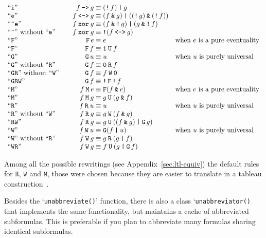 \documentclass[a4paper,twoside,10pt,DIV=12]{scrreprt}
\DeclareMathOperator{\F}{\texttt{F}}
\DeclareMathOperator{\G}{\texttt{G}}
\newcommand{\U}{\mathbin{\texttt{U}}}
\newcommand{\R}{\mathbin{\texttt{R}}}
\newcommand{\M}{\mathbin{\texttt{M}}}
\newcommand{\W}{\mathbin{\texttt{W}}}
\DeclareMathOperator{\NOT}{\texttt{!}}
\newcommand{\XOR}{\mathbin{\texttt{xor}}}
\newcommand{\IMPLIES}{\mathbin{\texttt{->}}}
\newcommand{\EQUIV}{\mathbin{\texttt{<->}}}
\newcommand{\OR}{\mathbin{\texttt{|}}}
\newcommand{\AND}{\mathbin{\texttt{\&}}}
\newcommand{\0}{\texttt{0}}
\newcommand{\1}{\texttt{1}}
\begin{document}
\[
\begin{array}{l@{\qquad}r@{\;}c@{\;}ll}
``\texttt{i}" & f\IMPLIES g &\equiv&  (\NOT f)\OR g\\
``\texttt{e}" & f\EQUIV g &\equiv&  (f\AND g)\OR ((\NOT g)\AND(\NOT f))\\
``\texttt{\^{}e}" & f\XOR g &\equiv&  (f\AND\NOT g)\OR (g\AND\NOT f)\\
``\texttt{\^{}}"\text{~without~}``\texttt{e}" & f\XOR g &\equiv&  \NOT(f\EQUIV g)\\
``\texttt{F}" & \F e&\equiv& e & \text{when $e$ is a pure eventuality}\\
``\texttt{F}" & \F f&\equiv& \1\U f\\
``\texttt{G}" & \G u&\equiv& u & \text{when $u$ is purely universal}\\
``\texttt{G}"\text{~without~}``\texttt{R}" & \G f&\equiv& \0\R f \\
``\texttt{GR}"\text{~without~}``\texttt{W}" & \G f&\equiv& f \W \0 \\
``\texttt{GRW}" & \G f&\equiv& \NOT\F\NOT f \\
``\texttt{M}" & f \M e&\equiv& \F(f\AND e) & \text{when $e$ is a pure eventuality} \\
``\texttt{M}" & f \M g&\equiv& g \U (g \AND f) \\
``\texttt{R}" & f \R u&\equiv& u & \text{when $u$ is purely universal} \\
``\texttt{R}"\text{~without~}``\texttt{W}" & f \R g&\equiv&  g\W (f \AND g)\\
``\texttt{RW}" & f \R g&\equiv&  g\U ((f \AND g) \OR \G g) \\
``\texttt{W}" & f \W u&\equiv& \G(f \OR u) & \text{when $u$ is purely universal} \\
``\texttt{W}"\text{~without~}``\texttt{R}" & f \W g&\equiv& g \R (g \OR f)\\
``\texttt{WR}" & f \W g&\equiv& f \U (g \OR \G f)\\
\end{array}
\]

Among all the possible rewritings (see Appendix~\ref{sec:ltl-equiv})
the default rules for $\R$, $\W$ and $\M$, those were chosen because
they are easier to translate in a tableau
construction~\cite[Fig.~11]{duret.11.vecos}.

Besides the `\verb=unabbreviate()=' function, there is also a class
`\verb=unabbreviator()= that implements the same functionality, but
maintains a cache of abbreviated subformulas.  This is preferable if
you plan to abbreviate many formulas sharing identical subformulas.
\end{document}
